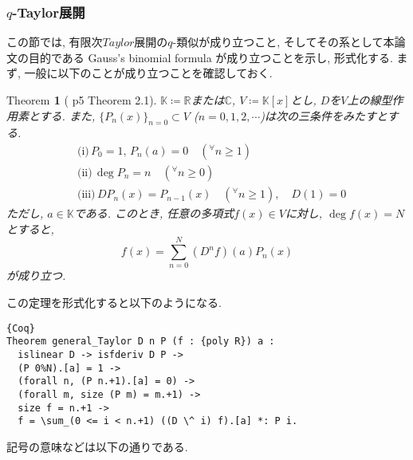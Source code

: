 \documentclass[11pt]{jarticle}
\theoremstyle{mystyle}
\newtheorem{thm}[df]{$\textrm{Theorem}$}
\newcommand{\bthm}{\begin{shadebox} \begin{thm}}
\newcommand{\ethm}{\end{thm} \end{shadebox}}
\newcommand{\bpf}{\begin{proof}}
\newcommand{\epf}{\end{proof}}
\newcommand{\R}{\mathbb{R}}
\newcommand{\C}{\mathbb{C}}
\newcommand{\K}{\mathbb{K}}
\newcommand{\0}{\textbf{0}}
\newcommand{\1}{\textbf{1}}
\newcommand{\2}{\textbf{2}}
\begin{document}
\subsubsection{$q$-Taylor展開}
この節では, 有限次$Taylor$展開の$q$-類似が成り立つこと, そしてその系として本論文の目的である Gauss's binomial formula が成り立つことを示し, 形式化する. 
まず, 一般に以下のことが成り立つことを確認しておく. 
\bthm[\cite{Kac} p5 Theorem 2.1] \label{general_Taylor}
$\K\coloneqq\R$または$\C$, $V\coloneqq\K[x]$とし, $D$を$V$上の線型作用素とする. また, 
$\{P_n(x)\}_{n=0}\subset V$ ($n=0,1,2,\cdots$)は次の三条件をみたすとする. 
  \begin{align*}
    &\textrm{(i)}\,P_0 = 1,\,P_n(a)=0 \quad ({}^{\forall}n\ge1)\\
    &\textrm{(ii)}\,\deg P_n = n \quad ({}^{\forall}n\ge0)\\
    &\textrm{(iii)}\,DP_n(x) = P_{n-1}(x) \quad ({}^{\forall}n\ge1), \quad D(1) = 0
  \end{align*}
ただし, $a\in\K$である. このとき, 任意の多項式$f(x)\in V$に対し, $\deg f(x)=N$とすると, 
  \[
    f(x) = \sum_{n=0}^N(D^nf)(a)P_n(x)
  \]
が成り立つ. 
\ethm
この定理を形式化すると以下のようになる. 
\begin{lstlisting}{Coq}
Theorem general_Taylor D n P (f : {poly R}) a :
  islinear D -> isfderiv D P ->
  (P 0%N).[a] = 1 ->
  (forall n, (P n.+1).[a] = 0) ->
  (forall m, size (P m) = m.+1) ->
  size f = n.+1 ->
  f = \sum_(0 <= i < n.+1) ((D \^ i) f).[a] *: P i.
\end{lstlisting}
記号の意味などは以下の通りである. 
\end{document}
